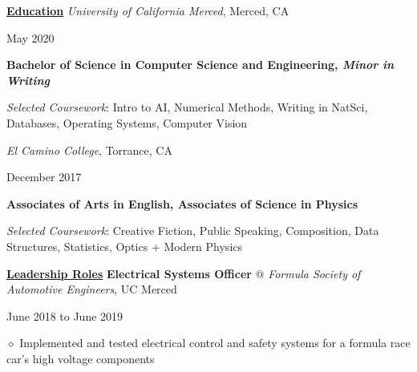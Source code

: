 \documentclass [11pt]{article}
\begin{document}
\begin{flushleft}
\linebreak

\vspace{7}
\underline{\textbf{Education}}
\linebreak
\emph{University of California Merced}, Merced, CA\begin{minipage}{0.63 \linewidth}\begin{flushright}May 2020\end{flushright}\end{minipage}
\textbf{Bachelor of Science in Computer Science and Engineering, \emph{Minor in Writing}}

\raggedleft
\emph{Selected Coursework}: Intro to AI, Numerical Methods, Writing in NatSci, Databases, Operating Systems, Computer Vision
\normalsize
\linebreak
\raggedright
\emph{El Camino College}, Torrance, CA\begin{minipage}{0.725 \linewidth}\begin{flushright}December 2017\end{flushright}\end{minipage}

\textbf{Associates of Arts in English, Associates of Science in Physics}

\raggedright
\emph{Selected Coursework}: Creative Fiction, Public Speaking, Composition, Data Structures, Statistics, Optics + Modern Physics
\normalsize

\linebreak
\raggedright

\vspace{7}
\underline{\textbf{Leadership Roles}}
\linebreak
\textbf{Electrical Systems Officer} @ \emph{Formula Society of Automotive Engineers}, UC Merced \begin{minipage}{0.300 \linewidth}\begin{flushright}June 2018 to June 2019\end{flushright}\end{minipage}

‭‭\quad\quad\quad$\diamond$ Implemented and tested electrical control and safety systems for a formula race car’s high voltage components


\end{flushleft}
\end{document}

